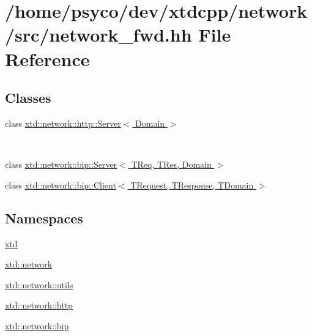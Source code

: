 \hypertarget{network__fwd_8hh}{}\section{/home/psyco/dev/xtdcpp/network/src/network\+\_\+fwd.hh File Reference}
\label{network__fwd_8hh}
\subsection*{Classes}
\begin{DoxyCompactItemize}
\item 
class \hyperlink{classxtd_1_1network_1_1http_1_1Server}{xtd\+::network\+::http\+::\+Server$<$ Domain $>$}
\begin{DoxyCompactList}\small\item\em ~\newline
~\newline
 \end{DoxyCompactList}\item 
class \hyperlink{classxtd_1_1network_1_1bip_1_1Server}{xtd\+::network\+::bip\+::\+Server$<$ T\+Req, T\+Res, Domain $>$}
\item 
class \hyperlink{classxtd_1_1network_1_1bip_1_1Client}{xtd\+::network\+::bip\+::\+Client$<$ T\+Request, T\+Response, T\+Domain $>$}
\end{DoxyCompactItemize}
\subsection*{Namespaces}
\begin{DoxyCompactItemize}
\item 
 \hyperlink{namespacextd}{xtd}
\item 
 \hyperlink{namespacextd_1_1network}{xtd\+::network}
\item 
 \hyperlink{namespacextd_1_1network_1_1utils}{xtd\+::network\+::utils}
\item 
 \hyperlink{namespacextd_1_1network_1_1http}{xtd\+::network\+::http}
\item 
 \hyperlink{namespacextd_1_1network_1_1bip}{xtd\+::network\+::bip}
\end{DoxyCompactItemize}
